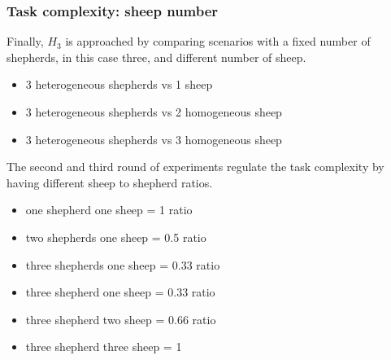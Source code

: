 \documentclass[conference]{IEEEtran}
\begin{document}
\subsubsection{Task complexity: sheep number}
Finally, $H_3$ is approached by comparing scenarios with a fixed number of shepherds, in this case three, and different number of sheep. 
\begin{itemize}
	\item 3 heterogeneous shepherds vs 1 sheep
	\item 3 heterogeneous shepherds vs 2 homogeneous sheep
	\item 3 heterogeneous shepherds vs 3 homogeneous sheep
\end{itemize}
The second and third round of experiments regulate the task complexity by having different sheep to shepherd ratios. 
\begin{itemize}
	\item one shepherd one sheep = 1 ratio
	\item two shepherds one sheep = 0.5 ratio
	\item three shepherds one sheep = 0.33 ratio
	
	\item three shepherd one sheep = 0.33 ratio
	\item three shepherd two sheep = 0.66 ratio
	\item three shepherd three sheep = 1
\end{itemize}







\end{document}
